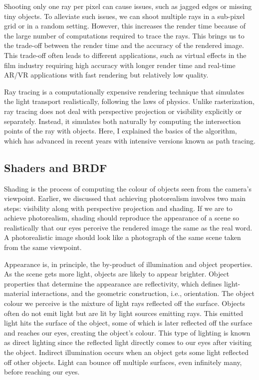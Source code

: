Shooting only one ray per pixel can cause issues, such as jagged edges or missing tiny objects. To alleviate such issues, we can shoot multiple rays in a sub-pixel grid or in a random setting. However, this increases the render time because of the large number of computations required to trace the rays. This brings us to the trade-off between the render time and the accuracy of the rendered image. This trade-off often leads to different applications, such as virtual effects in the film industry requiring high accuracy with longer render time and real-time AR/VR applications with fast rendering but relatively low quality.

Ray tracing is a computationally expensive rendering technique that simulates the light transport realistically, following the laws of physics. Unlike rasterization, ray tracing does not deal with perspective projection or visibility explicitly or separately. Instead, it simulates both naturally by computing the intersection points of the ray with objects. Here, I explained the basics of the algorithm, which has advanced in recent years with intensive versions known as path tracing. 

\subsection{Shaders and BRDF}

Shading is the process of computing the colour of objects seen from the camera's viewpoint. Earlier, we discussed that achieving photorealism involves two main steps:  visibility along with perspective projection and shading. If we are to achieve photorealism, shading should reproduce the appearance of a scene so realistically that our eyes perceive the rendered image the same as the real word. A photorealistic image should look like a photograph of the same scene taken from the same viewpoint. 

Appearance is, in principle, the by-product of illumination and object properties. As the scene gets more light, objects are likely to appear brighter. Object properties that determine the appearance are reflectivity, which defines light-material interactions, and the geometric construction, i.e., orientation. The object colour we perceive is the mixture of light rays reflected off the surface. Objects often do not emit light but are lit by light sources emitting rays. This emitted light hits the surface of the object, some of which is later reflected off the surface and reaches our eyes, creating the object's colour. This type of lighting is known as direct lighting since the reflected light directly comes to our eyes after visiting the object. Indirect illumination occurs when an object gets some light reflected off other objects. Light can bounce off multiple surfaces, even infinitely many, before reaching our eyes.


